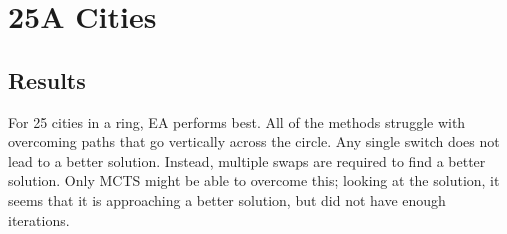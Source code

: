 
\section{25A Cities}
\subsection{Results}
For 25 cities in a ring, EA performs best.  All of the methods struggle with overcoming paths that go vertically across the circle.  Any single switch does not lead to a better solution.  Instead, multiple swaps are required to find a better solution.  Only MCTS might be able to overcome this; looking at the solution, it seems that it is approaching a better solution, but did not have enough iterations.

